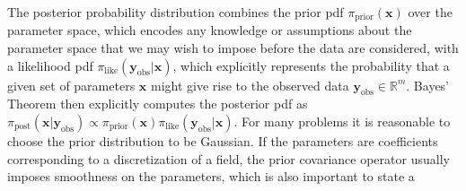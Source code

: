 \documentclass[11pt,final]{article}%
\renewcommand{\vec}[1] {\ensuremath{\boldsymbol{#1}}}
\begin{document}

The posterior probability distribution combines the prior pdf
$\pi_{\text{prior}}(\vec{x})$ over the parameter space, which encodes
any knowledge or assumptions about the parameter space that we may
wish to impose before the data are considered, with a likelihood pdf
$\pi_{\text{like}}(\vec{y}_{\text{obs}}|\vec{x})$, which explicitly
represents the probability that a given set of parameters $\vec{x}$
might give rise to the observed data $\vec{y}_{\text{obs}} \in
\mathbb{R}^m$.  Bayes' Theorem then explicitly computes the posterior
pdf as
$ \pi_{\text{post}}(\vec{x} | \vec{y}_{\text{obs}}) \propto
\pi_{\text{prior}}(\vec{x}) \pi_{\text{like}}(\vec{y}_{\text{obs}} | \vec{x})$.
%
For many problems it is reasonable to choose the prior distribution to
be Gaussian. If the parameters are coefficients corresponding to a
discretization of a field, the prior covariance operator usually
imposes smoothness on the parameters, which is also important to state a
\end{document}
